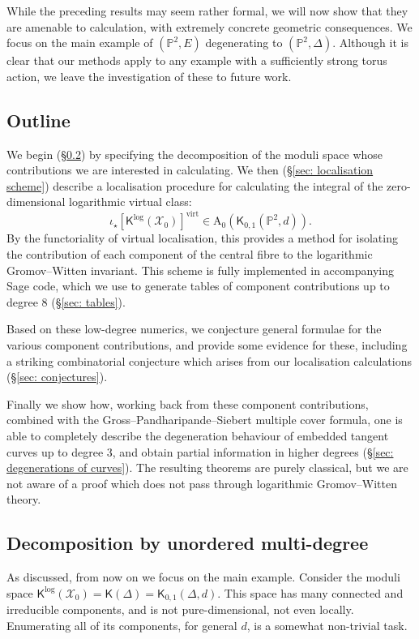 \documentclass[11pt]{amsart}
\theoremstyle{definition}
\theoremstyle{definition}
\newcommand{\op}[1]{\operatorname{#1}}
\newcommand{\PP}{\mathbb{P}}
\newcommand{\virt}{\op{virt}}
\newcommand{\Xcal}{\mathcal{X}}
\newcommand{\Kup}{\mathsf{K}}
\begin{document}
\noindent While the preceding results may seem rather formal, we will now show that they are amenable to calculation, with extremely concrete geometric consequences. We focus on the main example of $(\PP^2,E)$ degenerating to $(\PP^2,\Delta)$. Although it is clear that our methods apply to any example with a sufficiently strong torus action, we leave the investigation of these to future work.

\subsection{Outline} We begin (\S \ref{sec: decomp by multidegree}) by specifying the decomposition of the moduli space whose contributions we are interested in calculating. We then (\S \ref{sec: localisation scheme}) describe a localisation procedure for calculating the integral of the zero-dimensional logarithmic virtual class:
\begin{equation*} \iota_\star [\Kup^{\log}(\Xcal_0)]^{\virt} \in \mathrm{A}_0(\Kup_{0,1}(\PP^2,d)).\end{equation*}
By the functoriality of virtual localisation, this provides a method for isolating the contribution of each component of the central fibre to the logarithmic Gromov--Witten invariant. This scheme is fully implemented in accompanying Sage code, which we use to generate tables of component contributions up to degree 8 (\S \ref{sec: tables}).

Based on these low-degree numerics, we conjecture general formulae for the various component contributions, and provide some evidence for these, including a striking combinatorial conjecture which arises from our localisation calculations (\S \ref{sec: conjectures}).

Finally we show how, working back from these component contributions, combined with the Gross--Pandharipande--Siebert multiple cover formula, one is able to completely describe the degeneration behaviour of embedded tangent curves up to degree $3$, and obtain partial information in higher degrees (\S \ref{sec: degenerations of curves}). The resulting theorems are purely classical, but we are not aware of a proof which does not pass through logarithmic Gromov--Witten theory.

\subsection{Decomposition by unordered multi-degree}\label{sec: decomp by multidegree} \label{sec: decomposition of moduli space} As discussed, from now on we focus on the main example. Consider the moduli space $\Kup^{\log}(\Xcal_0)=\Kup(\Delta)=\Kup_{0,1}(\Delta,d)$. This space has many connected and irreducible components, and is not pure-dimensional, not even locally. Enumerating all of its components, for general $d$, is a somewhat non-trivial task.
\end{document}
